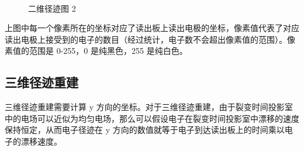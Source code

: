 \documentclass[AutoFakeBold]{LZUThesis}
\begin{document}
\begin{figure}[H]
	\centering
	\\	
    \caption{二维径迹图 2}
    \label{fig_track_2d_2}
\end{figure}

上图中每一个像素所在的坐标对应了读出板上读出电极的坐标，像素值代表了对应读出电极上接受到的电子的数目（经过统计，电子数不会超出像素值的范围）。像素值的范围是 0-255，0 是纯黑色，255 是纯白色。






\subsection{三维径迹重建}
三维径迹重建需要计算 y 方向的坐标。对于三维径迹重建，由于裂变时间投影室中的电场可以近似为均匀电场，那么可以假设电子在裂变时间投影室中漂移的速度保持恒定，从而电子径迹在 y 方向的数值就等于电子到达读出板上的时间乘以电子的漂移速度。
\end{document}
